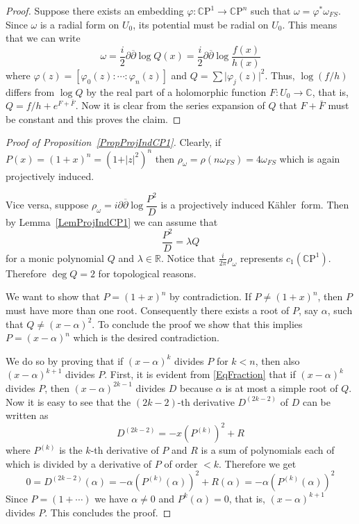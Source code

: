 \documentclass[12pt]{amsart}
\newcommand{\R}{\mathbb{R}}
\newcommand{\CP}{\mathbb{C}\mathrm{P}}
\newcommand{\C}{\mathbb{C}}
\newcommand{\de}{\partial}
\newcommand{\K}{K\"{a}hler}
\newcommand{\ov}[1]{\overline{#1}}
\newcommand{\deb}{\ov\partial}
\newcommand{\lra}{\longrightarrow}
\begin{document}
\begin{proof}
	Suppose there exists an embedding $\varphi:\CP^1\lra\CP^n$ such that $\omega=\varphi^*\omega_{FS}$.
	Since $\omega$ is a radial form on $U_0$, its potential must be radial on $U_0$. This means that we can write $$\omega=\frac{i}{2}\de\deb\log Q(x)= \frac{i}{2}\de\deb\log\dfrac{f(x)}{h(x)}$$
	where $\varphi(z)=[\varphi_0(z):\cdots:\varphi_n(z)]$ and $Q=\sum\vert\varphi_j(z)\vert^2$.
	Thus, $\log(f/h)$ differs from $\log Q$ by the real part of a holomorphic function $F:U_0\lra\C$, that is, $Q=f/h+e^{F+\bar F}$.
	Now it is clear from the series expansion of $Q$ that $F+\bar F$ must be constant and this proves the claim.
\end{proof}

\begin{proof}[Proof of Proposition~\ref{PropProjIndCP1}]
	Clearly, if $P(x)=\left(1+x\right)^n=\left(1+\vert z\vert^2\right)^n$ then $\rho_\omega =\rho(n\omega_{FS})=4\omega_{FS}$ which is again projectively induced.
	
	Vice versa, suppose $\rho_\omega = i\de\deb\log\dfrac{P^2}{D}$ is a projectively induced \K\ form.
	Then by Lemma~\ref{LemProjIndCP1} we can assume that 
	\begin{equation}\label{EqFraction}
		\dfrac{P^2}{D}=\lambda Q
	\end{equation}
	for a monic polynomial $Q$ and $\lambda\in\R$. 
	Notice that $\frac{i}{2\pi}\rho_\omega $ represents $c_1(\CP^1)$. Therefore $\deg Q=2$ for topological reasons.
	
	We want to show that $P=(1+x)^n$ by contradiction. 
	If $P\neq(1+x)^n$, then $P$ must have more than one root. 
	Consequently there exists a root of $P$, say $\alpha$, such that $Q\neq(x-\alpha)^2$.
	To conclude the proof we show that this implies $P=(x-\alpha)^n$ which is the desired contradiction.
	
	
	We do so by proving that if $(x-\alpha)^{k}$ divides $P$ for $k<n$, then also $(x-\alpha)^{k+1}$ divides $P$.
	First, it is evident from \eqref{EqFraction} that if $(x-\alpha)^{k}$ divides $P$, then $(x-\alpha)^{2k-1}$ divides $D$ because $\alpha$ is at most a simple root of $Q$.
	Now it is easy to see that the $(2k-2)$-th derivative $D^{(2k-2)}$ of $D$ can be written as
	\begin{equation}\label{EqDerivativesPoly}
		D^{(2k-2)}=-x\left(P^{(k)}\right)^2+R
	\end{equation}
	where $P^{(k)}$ is the  $k$-th derivative of $P$ and $R$ is a sum of polynomials each of which is divided by a derivative of $P$ of order $< k$. 
	Therefore we get
	\begin{equation}\label{EqDerivativesPolyEvaluated}
		0=D^{(2k-2)}(\alpha)=-\alpha\left(P^{(k)}(\alpha)\right)^2+R(\alpha)=-\alpha\left(P^{(k)}(\alpha)\right)^2
	\end{equation}
	Since $P=(1+\cdots)$ we have $\alpha\neq0$ and $P^{k}(\alpha)=0$, that is, $(x-\alpha)^{k+1}$ divides $P$.
	This concludes the proof.
\end{proof}
\end{document}
